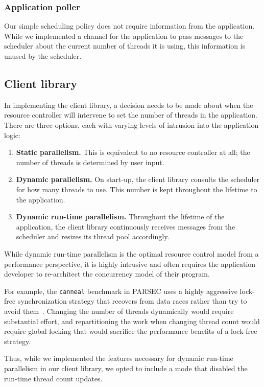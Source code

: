 \subsubsection{Application poller} 
Our simple scheduling policy does not require information from the application. While we implemented a channel for the application to pass messages to the scheduler about the current number of threads it is using, this information is unused by the scheduler.

\subsection{Client library}
In implementing the client library, a decision needs to be made about when the resource controller will intervene to set the number of threads in the application. There are three options, each with varying levels of intrusion into the application logic:

\begin{enumerate}
  \item \textbf{Static parallelism.} This is equivalent to no resource controller at all; the number of threads is determined by user input.
  \item \textbf{Dynamic parallelism.} On start-up, the client library consults the scheduler for how many threads to use. This number is kept throughout the lifetime to the application.
  \item \textbf{Dynamic run-time parallelism.} Throughout the lifetime of the application, the client library continuously receives messages from the scheduler and resizes its thread pool accordingly.
\end{enumerate}

While dynamic run-time parallelism is the optimal resource control model from a performance perspective, it is highly intrusive and often requires the application developer to re-architect the concurrency model of their program. 

For example, the \texttt{canneal} benchmark in PARSEC uses a highly aggressive lock-free synchronization strategy that recovers from data races rather than try to avoid them~\cite{bienia2008parsec}. Changing the number of threads dynamically would require substantial effort, and repartitioning the work when changing thread count would require global locking that would sacrifice the performance benefits of a lock-free strategy.

Thus, while we implemented the features necessary for dynamic run-time parallelism in our client library, we opted to include a mode that disabled the run-time thread count updates. 
